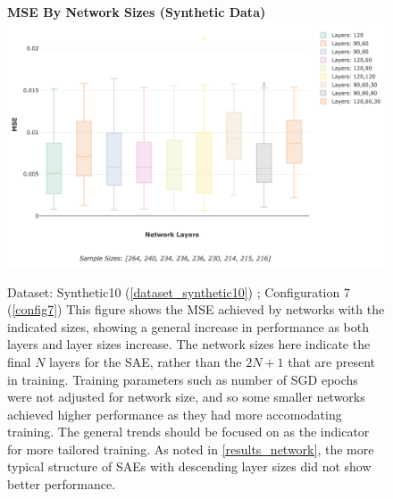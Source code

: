 \documentclass[a4paper,11pt,oneside]{article}
\theoremstyle{plain}
\theoremstyle{definition}
\begin{document}
\begin{figure}[H]
	\centering 
	\textbf{MSE By Network Sizes (Synthetic Data)}
	\includegraphics[scale=0.25]{images/results/network/synth_mse_box.png} 
	\caption[MSE By Network Sizes (Synthetic Data)]{Dataset: Synthetic10 (\ref{dataset_synthetic10}) ; Configuration 7 (\ref{config7})
		\newline This figure shows the MSE achieved by networks with the indicated sizes, showing a general increase in performance as both layers and layer sizes increase. The network sizes here indicate the final $N$ layers for the SAE, rather than the $2N + 1$ that are present in training. Training parameters such as number of SGD epochs were not adjusted for network size, and so some smaller networks achieved higher performance as they had more accomodating training. The general trends should be focused on as the indicator for more tailored training. As noted in \ref{results_network}, the more typical structure of SAEs with descending layer sizes did not show better performance.}
	\label{figure-synth_mse_box}
\end{figure}
\end{document}
